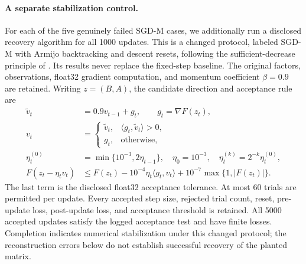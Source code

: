 \paragraph{A separate stabilization control.}
For each of the five genuinely failed SGD-M cases, we additionally run a disclosed recovery algorithm for all 1000 updates. This is a changed protocol, labeled SGD-M with Armijo backtracking and descent resets, following the sufficient-decrease principle of \citet{armijo1966minimization}. Its results never replace the fixed-step baseline. The original factors, observations, float32 gradient computation, and momentum coefficient $\beta=0.9$ are retained. Writing $z=(B,A)$, the candidate direction and acceptance rule are
\begin{align}
\widetilde v_t&=0.9v_{t-1}+g_t,\qquad g_t=\nabla F(z_t),\\
v_t&=\begin{cases}\widetilde v_t,&\langle g_t,\widetilde v_t\rangle>0,\\g_t,&\text{otherwise},\end{cases}\\
\eta_t^{(0)}&=\min\{10^{-3},2\eta_{t-1}\},\quad \eta_0=10^{-3},\quad \eta_t^{(k)}=2^{-k}\eta_t^{(0)},\\
F(z_t-\eta_t v_t)&\le F(z_t)-10^{-4}\eta_t\langle g_t,v_t\rangle
+10^{-7}\max\{1,|F(z_t)|\}.
\end{align}
The last term is the disclosed float32 acceptance tolerance. At most 60 trials are permitted per update. Every accepted step size, rejected trial count, reset, pre-update loss, post-update loss, and acceptance threshold is retained. All 5000 accepted updates satisfy the logged acceptance test and have finite losses. Completion indicates numerical stabilization under this changed protocol; the reconstruction errors below do not establish successful recovery of the planted matrix.
